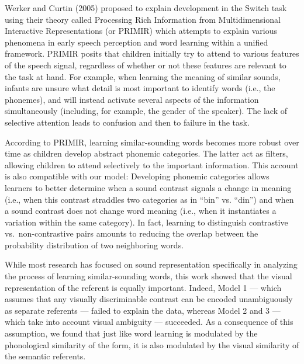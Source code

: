 \documentclass[english,,man,floatsintext]{apa6}
\theoremstyle{definition}
\theoremstyle{definition}
\theoremstyle{definition}
\theoremstyle{remark}
\begin{document}
Werker and Curtin (2005) proposed to explain development in the Switch
task using their theory called Processing Rich Information from
Multidimensional Interactive Representations (or PRIMIR) which attempts
to explain various phenomena in early speech perception and word
learning within a unified framework. PRIMIR posits that children
initially try to attend to various features of the speech signal,
regardless of whether or not these features are relevant to the task at
hand. For example, when learning the meaning of similar sounds, infants
are unsure what detail is most important to identify words (i.e., the
phonemes), and will instead activate several aspects of the information
simultaneously (including, for example, the gender of the speaker). The
lack of selective attention leads to confusion and then to failure in
the task.

According to PRIMIR, learning similar-sounding words becomes more robust
over time as children develop abstract phonemic categories. The latter
act as filters, allowing children to attend selectively to the important
information. This account is also compatible with our model: Developing
phonemic categories allows learners to better determine when a sound
contrast signals a change in meaning (i.e., when this contrast straddles
two categories as in \enquote{bin} vs. \enquote{din}) and when a sound
contrast does not change word meaning (i.e., when it instantiates a
variation within the same category). In fact, learning to distinguish
contrastive vs.~non-contrastive pairs amounts to reducing the overlap
between the probability distribution of two neighboring words.

While most research has focused on sound representation specifically in
analyzing the process of learning similar-sounding words, this work
showed that the visual representation of the referent is equally
important. Indeed, Model 1 --- which assumes that any visually
discriminable contrast can be encoded unambiguously as separate
referents --- failed to explain the data, whereas Model 2 and 3 ---
which take into account visual ambiguity --- succeeded. As a consequence
of this assumption, we found that just like word learning is modulated
by the phonological similarity of the form, it is also modulated by the
visual similarity of the semantic referents.
\end{document}
